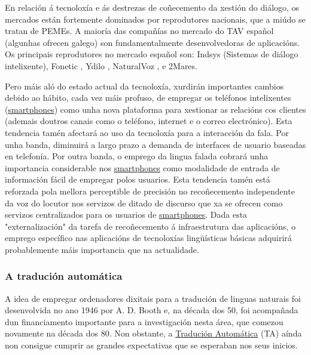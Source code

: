 \begin{multicols}{2}
En relación á tecnoloxía e ás destrezas de coñecemento da xestión do diálogo, os mercados están fortemente dominados por reprodutores nacionais, que a miúdo se tratan de PEMEs.
A maioría das compañías no mercado do TAV español (algunhas ofrecen galego) son fundamentalmente desenvolvedoras de aplicacións. Os principais reprodutores no mercado español son: Indsys \cite{GAL-Nota27} (Sistemas de diálogo intelixente), Fonetic \cite{GAL-Nota28}, Ydilo \cite{GAL-Nota29}, NaturalVoz \cite{GAL-Nota30}, e 2Mares.

Pero máis aló do estado actual da tecnoloxía, xurdirán importantes cambios debido ao hábito, cada vez máis profuso, de empregar os teléfonos intelixentes (\uline{smartphones}) como unha nova plataforma para xestionar as relacións cos clientes (ademais doutros canais como o teléfono, internet e o correo electrónico). Esta tendencia tamén afectará ao uso da tecnoloxía para a interacción da fala. Por unha banda, diminuirá a largo prazo a demanda de interfaces de usuario baseadas en telefonía. Por outra banda, o emprego da lingua falada cobrará unha importancia considerable nos \uline{smartphones} como modalidade de entrada de información fácil de empregar polos usuarios. Esta tendencia tamén está reforzada pola mellora perceptible de precisión no recoñecemento independente da voz do locutor nos servizos de ditado de discurso que xa se ofrecen como servizos centralizados para os usuarios de \uline{smartphones}. Dada esta "externalización" da tarefa de recoñecemento á infraestrutura das aplicacións, o emprego específico nas aplicacións de tecnoloxías lingüísticas básicas adquirirá probablemente máis importancia que na actualidade. 

\subsubsection{A tradución automática}

  A idea de empregar ordenadores dixitais para a tradución de linguas naturais foi desenvolvida no ano 1946 por A. D. Booth e, na década dos 50, foi acompañada dun financiamento importante para a investigación nesta área, que comezou novamente na década dos 80. Non obstante, a \uline{Tradución Automática} (TA) aínda non consigue cumprir as grandes expectativas que se esperaban nos seus inicios. 

   



\end{multicols}
